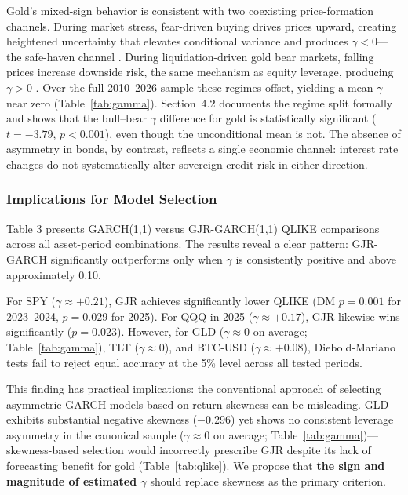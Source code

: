 Gold's mixed-sign behavior is consistent with two coexisting price-formation channels. During market stress, fear-driven buying drives prices upward, creating heightened uncertainty that elevates conditional variance and produces $\gamma < 0$---the safe-haven channel \citep{baur2010safe,baur2010hedge}. During liquidation-driven gold bear markets, falling prices increase downside risk, the same mechanism as equity leverage, producing $\gamma > 0$ \citep{black1976,christie1982}. Over the full 2010--2026 sample these regimes offset, yielding a mean $\gamma$ near zero (Table~\ref{tab:gamma}). Section~4.2 documents the regime split formally and shows that the bull--bear $\gamma$ difference for gold is statistically significant ($t = -3.79$, $p < 0.001$), even though the unconditional mean is not. The absence of asymmetry in bonds, by contrast, reflects a single economic channel: interest rate changes do not systematically alter sovereign credit risk in either direction.

\subsubsection{Implications for Model Selection}

Table 3 presents GARCH(1,1) versus GJR-GARCH(1,1) QLIKE comparisons across all asset-period combinations. The results reveal a clear pattern: GJR-GARCH significantly outperforms only when $\gamma$ is consistently positive and above approximately 0.10.

For SPY ($\gamma \approx +0.21$), GJR achieves significantly lower QLIKE (DM $p = 0.001$ for 2023--2024, $p = 0.029$ for 2025). For QQQ in 2025 ($\gamma \approx +0.17$), GJR likewise wins significantly ($p = 0.023$). However, for GLD ($\gamma \approx 0$ on average; Table~\ref{tab:gamma}), TLT ($\gamma \approx 0$), and BTC-USD ($\gamma \approx +0.08$), Diebold-Mariano tests fail to reject equal accuracy at the 5\% level across all tested periods.

This finding has practical implications: the conventional approach of selecting asymmetric GARCH models based on return skewness can be misleading. GLD exhibits substantial negative skewness ($-0.296$) yet shows no consistent leverage asymmetry in the canonical sample ($\gamma \approx 0$ on average; Table~\ref{tab:gamma})---skewness-based selection would incorrectly prescribe GJR despite its lack of forecasting benefit for gold (Table~\ref{tab:qlike}). We propose that \textbf{the sign and magnitude of estimated $\gamma$} should replace skewness as the primary criterion.

